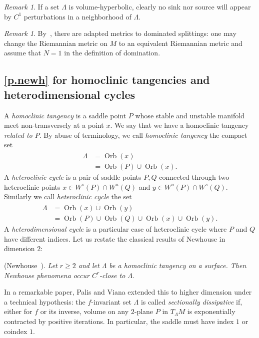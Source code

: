\documentclass[11pt, a4paper]{amsart}
\theoremstyle{plain}
\theoremstyle{definition}
\theoremstyle{remark}
\newtheorem{remark}[proposition]{Remark}
\numberwithin{equation}{section}         %
\def\Orb{\operatorname{Orb}}
\begin{document}
\begin{remark}
If a set $\Lambda$ is volume-hyperbolic, clearly no sink nor source will appear by $C^1$ perturbations in a neighborhood of $\Lambda$.
\end{remark}

\begin{remark}
By~\cite{G1}, there are adapted metrics to dominated splittings: one may change the Riemannian metric on $M$ to an equivalent Riemannian metric and assume that $N=1$ in the definition of domination.
\end{remark}

\subsection{\cref{p.newh} for homoclinic tangencies and heterodimensional cycles}\label{s.turaevconj}
A {\em homoclinic tangency} is a saddle point $P$ whose stable and unstable manifold meet non-transversely at a point $x$. We say that we have a homoclinic tangency {\em related to $P$}. By abuse of terminology, we call {\em homoclinic tangency} the compact set 
\begin{align*}\Lambda&=\overline{\Orb(x)}\\
&=\Orb(P)\cup \Orb(x).
\end{align*}
 A {\em heteroclinic cycle} is a pair of saddle points $P,Q$ connected through two heteroclinic points $x\in W^s(P)\cap W^u(Q)$ and  $y\in W^u(P)\cap W^s(Q)$. Similarly we call {\em heteroclinic cycle} the set 
\begin{align*}
\Lambda&=\overline{\Orb(x)\cup \Orb(y)}\\
	&= \Orb(P)\cup \Orb(Q) \cup \Orb(x)\cup \Orb(y).
\end{align*}
A {\em heterodimensional cycle} is a particular case of heteroclinic cycle where $P$ and $Q$ have different indices.
Let us restate the classical results  of Newhouse in dimension $2$:
\medskip

 (Newhouse~\cite{N1,N2}). {\em Let $r\geq 2$ and let $\Lambda$ be a homoclinic tangency on a surface. Then Newhouse phenomena occur $C^r$-close to $\Lambda$.}
\medskip

In a remarkable paper, Palis and Viana extended this to higher dimension under a technical hypothesis: the $f$-invariant set $\Lambda$ is called {\em sectionally dissipative} if, either for $f$ or its inverse, volume on any $2$-plane $P$ in $T_\Lambda M$ is exponentially contracted by positive iterations. In particular, the saddle must have index $1$ or coindex $1$. 
 \medskip
\end{document}
